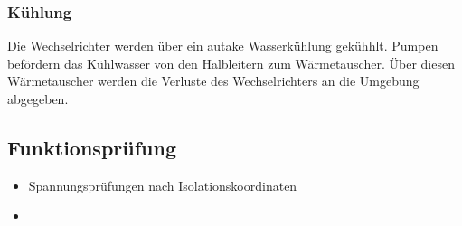 \subsubsection*{Kühlung}
Die Wechselrichter werden über ein autake Wasserkühlung gekühhlt. Pumpen befördern das Kühlwasser von den Halbleitern 
zum Wärmetauscher. Über diesen Wärmetauscher werden die Verluste des Wechselrichters an die Umgebung abgegeben. 

\subsection{Funktionsprüfung}

\begin{itemize}
    \item Spannungsprüfungen nach Isolationskoordinaten 
    \item 
\end{itemize}
                                                           
